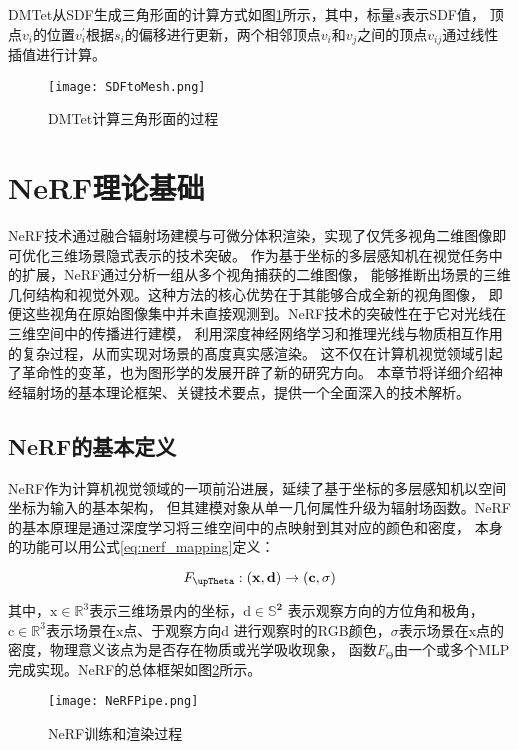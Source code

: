 DMTet从SDF生成三角形面的计算方式如图\ref{fig:dmtet_calc}所示，其中，标量$s$表示SDF值，
顶点$v_i$的位置$v_i^\prime$根据$s_i$的偏移进行更新，两个相邻顶点$v_i$和$v_j$之间的顶点$v_{ij}$通过线性插值进行计算。

\begin{figure}[htbp]
  \centering
  \texttt{[image: SDFtoMesh.png]}
  \caption{DMTet计算三角形面的过程}
  \label{fig:dmtet_calc}
\end{figure}

\section{NeRF理论基础}

NeRF技术通过融合辐射场建模与可微分体积渲染，实现了仅凭多视角二维图像即可优化三维场景隐式表示的技术突破。
作为基于坐标的多层感知机在视觉任务中的扩展，NeRF通过分析一组从多个视角捕获的二维图像，
能够推断出场景的三维几何结构和视觉外观。这种方法的核心优势在于其能够合成全新的视角图像，
即便这些视角在原始图像集中并未直接观测到。NeRF技术的突破性在于它对光线在三维空间中的传播进行建模，
利用深度神经网络学习和推理光线与物质相互作用的复杂过程，从而实现对场景的髙度真实感渲染。
这不仅在计算机视觉领域引起了革命性的变革，也为图形学的发展开辟了新的研究方向。
本章节将详细介绍神经辐射场的基本理论框架、关键技术要点，提供一个全面深入的技术解析。

\subsection{NeRF的基本定义}
NeRF作为计算机视觉领域的一项前沿进展，延续了基于坐标的多层感知机以空间坐标为输入的基本架构，
但其建模对象从单一几何属性升级为辐射场函数。NeRF的基本原理是通过深度学习将三维空间中的点映射到其对应的颜色和密度，
本身的功能可以用公式\eqref{eq:nerf_mapping}定义：

\begin{equation}
  F_{\upTheta}:({\bf{x}}, {\bf{d}})\rightarrow({\bf{c}},\sigma)
  \label{eq:nerf_mapping}
\end{equation}

其中，$\mathrm{x}\in\mathbb{R}^3$表示三维场景内的坐标，$\mathrm{d}\in\mathbb{S}^\mathbf{2}$
表示观察方向的方位角和极角，$\mathrm{c}\in\mathbb{R}^3$表示场景在$\mathrm{x}$点、于观察方向$\mathrm{d}$
进行观察时的RGB颜色，$\sigma$表示场景在$\mathrm{x}$点的密度，物理意义该点为是否存在物质或光学吸收现象，
函数$F_{\upTheta}$由一个或多个MLP完成实现。NeRF的总体框架如图\ref{fig:nerf_pipe}所示。


\begin{figure}[htbp]
  \centering
  \texttt{[image: NeRFPipe.png]}
  \caption{NeRF训练和渲染过程\cite{Mildenhall_2020}}
  \label{fig:nerf_pipe}
\end{figure}

